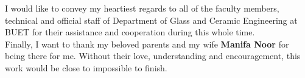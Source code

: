 \documentclass[main.tex]{subfiles}
\begin{document}
\noindent I would like to convey my heartiest regards to all of the faculty members, technical and official staff of Department of Glass and Ceramic Engineering at BUET for their assistance and cooperation during this whole time.\\

\noindent Finally, I want to thank my beloved parents and my wife \textbf{Manifa Noor} for being there for me. Without their love, understanding and encouragement, this work would be close to impossible to finish.\\


\thispagestyle{fancy}
\newpage
\end{document}
